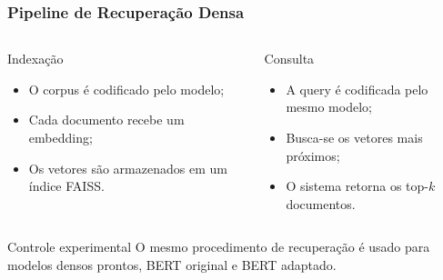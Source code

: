 \documentclass[aspectratio=169]{beamer}
\begin{document}
\begin{frame}
\frametitle{Pipeline de Recuperação Densa}

\begin{columns}

\begin{block}{Indexação}
\begin{itemize}
  \item O corpus é codificado pelo modelo;
  \item Cada documento recebe um embedding;
  \item Os vetores são armazenados em um índice FAISS.
\end{itemize}
\end{block}

\begin{block}{Consulta}
\begin{itemize}
  \item A query é codificada pelo mesmo modelo;
  \item Busca-se os vetores mais próximos;
  \item O sistema retorna os top-$k$ documentos.
\end{itemize}
\end{block}

\end{columns}

\vspace{0.3cm}

\begin{alertblock}{Controle experimental}
O mesmo procedimento de recuperação é usado para modelos densos prontos, BERT original e BERT adaptado.
\end{alertblock}

\end{frame}
\end{document}
